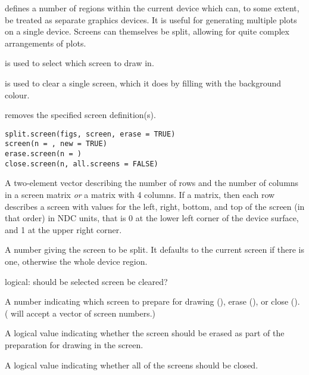%
\begin{Description}\relax
{} defines a number of regions within the current
device which can, to some extent, be treated as separate graphics
devices.  It is useful for generating multiple plots on a single
device.  Screens can themselves be split, allowing for quite complex
arrangements of plots.

 is used to select which screen to draw in.

 is used to clear a single screen, which it
does by filling with the background colour.

 removes the specified screen definition(s).
\end{Description}
%
\begin{Usage}
\begin{verbatim}
split.screen(figs, screen, erase = TRUE)
screen(n = , new = TRUE)
erase.screen(n = )
close.screen(n, all.screens = FALSE)
\end{verbatim}
\end{Usage}
%
\begin{Arguments}
\begin{ldescription}
\item[\code{figs}] A two-element vector describing the number of rows and the
number of columns in a screen matrix \emph{or} a matrix with 4 columns.
If a matrix, then each row describes a screen with values for the left,
right, bottom, and top of the screen (in that order) in NDC units,
that is 0 at the lower left corner of the device surface, and 1 at
the upper right corner.
\item[\code{screen}] A number giving the screen to be split.  It defaults to
the current screen if there is one, otherwise the whole device region.
\item[\code{erase}] logical: should be selected screen be cleared?
\item[\code{n}] A number indicating which screen to prepare for drawing
(), erase (), or close
().  ( will accept a vector of
screen numbers.)
\item[\code{new}] A logical value indicating whether the screen should be
erased as part of the preparation for drawing in the screen.
\item[\code{all.screens}] A logical value indicating whether all of the
screens should be closed.
\end{ldescription}
\end{Arguments}
